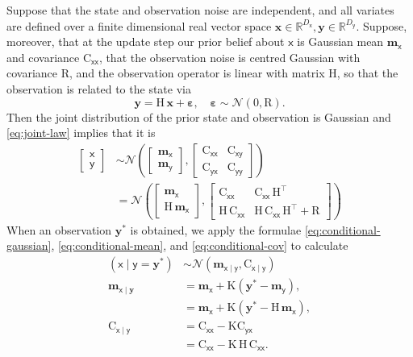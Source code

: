 \documentclass[runningheads]{llncs}
\newcommand{\vv}[1]{\boldsymbol{#1}}
\newcommand{\mm}[1]{\mathrm{#1}}
\newcommand{\rv}[1]{\mathsf{#1}}
\newcommand{\vrv}[1]{\vv{\rv{#1}}}
\newcommand{\Normal}{\mathcal{N}}
\newcommand{\gvn}{\mid}
\begin{document}
Suppose that the state and observation noise are independent, and all variates are defined over a finite dimensional real vector space
$\vv{x}\in\mathbb{R}^{D_{\vrv{x}}}, \vv{y}\in \mathbb{R}^{D_{\vrv{y}}}.$
Suppose, moreover, that at the update step our prior belief about $\vrv{x}$ is Gaussian mean \(\vv{m}_{\vrv{x}}\) and covariance \(\mm{C}_{\vrv{xx}}\), that the observation noise is centred Gaussian with covariance \(\mm{R}\), and the observation operator is linear with matrix \(\mm{H}\), so that the observation is related to the state via
\[
\vv{y} = \mm{H}\,\vv{x} + \vv{\varepsilon}, \quad \vv{\varepsilon} \sim \mathcal{N}(0,\mm{R}).
\]
Then the joint distribution of the prior state and observation is Gaussian and \eqref{eq:joint-law} implies that it is
\begin{align}
\begin{bmatrix}
\vrv{x} \\
\vrv{y}
\end{bmatrix}
&\sim \mathcal{N}\!\left(
    \begin{bmatrix}
    \vv{m}_{\vrv{x}} \\
    \vv{m}_{\vrv{y}}
    \end{bmatrix},
    \begin{bmatrix}
    \mm{C}_{\vrv{xx}} & \mm{C}_{\vrv{xy}} \\
    \mm{C}_{\vrv{yx}} & \mm{C}_{\vrv{yy}}
    \end{bmatrix}
    \right)\\
&=\mathcal{N}\!\left(
    \begin{bmatrix}
    \vv{m}_{\vrv{x}} \\
    \mm{H}\,\vv{m}_{\vrv{x}}
    \end{bmatrix},
    \begin{bmatrix}
    \mm{C}_{\vrv{xx}} & \mm{C}_{\vrv{xx}}\,\mm{H}^\top \\
    \mm{H}\,\mm{C}_{\vrv{xx}} & \mm{H}\,\mm{C}_{\vrv{xx}}\,\mm{H}^\top + \mm{R}
    \end{bmatrix}
    \right)
\end{align}
When an observation \(\vv{y}^*\) is obtained, we apply the formulae
\eqref{eq:conditional-gaussian}, \eqref{eq:conditional-mean}, and \eqref{eq:conditional-cov} to calculate
\begin{align}
\left(\vrv{x} \gvn \vrv{y} {=} \vv{y}^*\right)
&\sim\Normal(\vv{m}_{\vrv{x}\gvn\vrv{y}}, \mm{C}_{\vrv{x}\gvn\vrv{y}})\\
\vv{m}_{\vrv{x}\gvn \vv{y}}
&= \vv{m}_{\vrv{x}} + \mm{K} \left(\vv{y}^* - \vv{m}_{\vrv{y}}\right),\\
&= \vv{m}_{\vrv{x}} + \mm{K} \left(\vv{y}^* - \mm{H}\,\vv{m}_{\vrv{x}}\right),\\
\mm{C}_{\vrv{x}\gvn\vrv{y}}
&= \mm{C}_{\vrv{xx}} - \mm{K}\mm{C}_{\vrv{yx}}\\
&= \mm{C}_{\vrv{xx}} - \mm{K}\,\mm{H}\,\mm{C}_{\vrv{xx}}.
\end{align}
\end{document}

